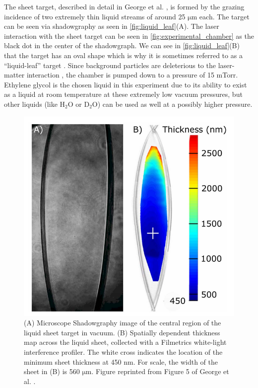 The sheet target, described in detail in George et al. \cite{George_2019_HPLSE}, is formed by the grazing incidence of two extremely thin liquid streams of around 25 $\unit{\micro \meter}$ each. The target can be seen via shadowgraphy as seen in \autoref{fig:liquid_leaf}(A). The laser interaction with the sheet target can be seen in \autoref{fig:experimental_chamber} as the black dot in the center of the shadowgraph. We can see in \autoref{fig:liquid_leaf}(B) that the target has an oval shape which is why it is sometimes referred to as a ``liquid-leaf'' target \cite{Schmitz_2023_LaPB}. Since background particles are deleterious to the laser-matter interaction \cite{Snyder_2020_SciRep}, the chamber is pumped down to a pressure of 15 mTorr. Ethylene glycol is the chosen liquid in this experiment due to its ability to exist as a liquid at room temperature at these extremely low vacuum pressures, but other liquids (like $\text{H}_2\text{O}$ or $\text{D}_2\text{O}$) can be used as well at a possibly higher pressure.

\begin{figure}
	\centering 
	\includegraphics[width=0.75\linewidth]{planning/images/daq/target.PNG}
	\caption{(A) Microscope Shadowgraphy image of the central region of the liquid sheet target in vacuum. (B) Spatially dependent thickness map across the liquid sheet, collected with a Filmetrics white-light interference profiler. The white cross indicates the location of the minimum sheet thickness at 450 $\unit{\nano \meter}$. For scale, the width of the sheet in (B) is 560 $\unit{\micro \meter}$. Figure reprinted from Figure 5 of George et al. \cite{George_2019_HPLSE}.}
	\label{fig:liquid_leaf}
\end{figure}

